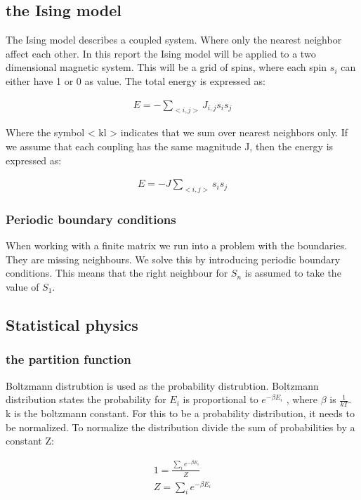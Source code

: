 
\subsection{the Ising model}

The Ising model describes a coupled system. Where only the nearest neighbor affect each other. In this report the Ising model will be applied to a two dimensional magnetic system. This will be a grid of spins, where each spin $s_i$ can either have 1 or 0 as value. The total energy is expressed as: 


\begin{align*}
	E = - \sum_{<i,j>} J_{i,j} s_i s_j
\end{align*}

Where the symbol < kl > indicates that we sum over nearest neighbors only.
If we assume that each coupling has the same magnitude J, then the energy is expressed as: 

\begin{align}
	E = - J \sum_{<i,j>} s_i s_j
	\label{eq:ising-energy}
\end{align}

\subsubsection{Periodic boundary conditions}

When working with a finite matrix we run into a problem with the boundaries. They are missing neighbours. We solve this by introducing periodic boundary conditions. This means that the right neighbour for $S_n$ is assumed to take the value of $S_1$. 

\subsection{Statistical physics}

\subsubsection{the partition function}

Boltzmann distrubtion is used as the probability distrubtion. Boltzmann distribution states the probability for $E_i$ is proportional to $e^{-\beta E_i}$ , where $\beta$ is $\frac{1}{kT}$. k is the boltzmann constant. For this to be a probability distribution, it needs to be normalized. To normalize the distribution divide the sum of probabilities by a constant Z: 

\begin{align*}
	1 = \frac{\sum_{i} e^{-\beta E_i}}{Z}
	\\
	Z = \sum_{i} e^{-\beta E_i}
\end{align*}

